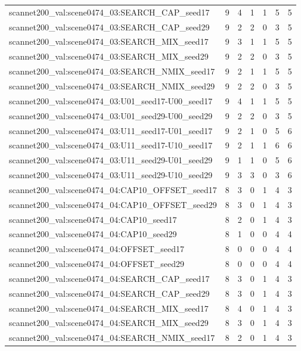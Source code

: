 \begin{table}[t]
\begin{tabular}{lrrrrrr}
scannet200\_val:scene0474\_03:SEARCH\_CAP\_seed17 & 9 & 4 & 1 & 1 & 5 & 5 \\
scannet200\_val:scene0474\_03:SEARCH\_CAP\_seed29 & 9 & 2 & 2 & 0 & 3 & 5 \\
scannet200\_val:scene0474\_03:SEARCH\_MIX\_seed17 & 9 & 3 & 1 & 1 & 5 & 5 \\
scannet200\_val:scene0474\_03:SEARCH\_MIX\_seed29 & 9 & 2 & 2 & 0 & 3 & 5 \\
scannet200\_val:scene0474\_03:SEARCH\_NMIX\_seed17 & 9 & 2 & 1 & 1 & 5 & 5 \\
scannet200\_val:scene0474\_03:SEARCH\_NMIX\_seed29 & 9 & 2 & 2 & 0 & 3 & 5 \\
scannet200\_val:scene0474\_03:U01\_seed17-U00\_seed17 & 9 & 4 & 1 & 1 & 5 & 5 \\
scannet200\_val:scene0474\_03:U01\_seed29-U00\_seed29 & 9 & 2 & 2 & 0 & 3 & 5 \\
scannet200\_val:scene0474\_03:U11\_seed17-U01\_seed17 & 9 & 2 & 1 & 0 & 5 & 6 \\
scannet200\_val:scene0474\_03:U11\_seed17-U10\_seed17 & 9 & 2 & 1 & 1 & 6 & 6 \\
scannet200\_val:scene0474\_03:U11\_seed29-U01\_seed29 & 9 & 1 & 1 & 0 & 5 & 6 \\
scannet200\_val:scene0474\_03:U11\_seed29-U10\_seed29 & 9 & 3 & 3 & 0 & 3 & 6 \\
scannet200\_val:scene0474\_04:CAP10\_OFFSET\_seed17 & 8 & 3 & 0 & 1 & 4 & 3 \\
scannet200\_val:scene0474\_04:CAP10\_OFFSET\_seed29 & 8 & 3 & 0 & 1 & 4 & 3 \\
scannet200\_val:scene0474\_04:CAP10\_seed17 & 8 & 2 & 0 & 1 & 4 & 3 \\
scannet200\_val:scene0474\_04:CAP10\_seed29 & 8 & 1 & 0 & 0 & 4 & 4 \\
scannet200\_val:scene0474\_04:OFFSET\_seed17 & 8 & 0 & 0 & 0 & 4 & 4 \\
scannet200\_val:scene0474\_04:OFFSET\_seed29 & 8 & 0 & 0 & 0 & 4 & 4 \\
scannet200\_val:scene0474\_04:SEARCH\_CAP\_seed17 & 8 & 3 & 0 & 1 & 4 & 3 \\
scannet200\_val:scene0474\_04:SEARCH\_CAP\_seed29 & 8 & 3 & 0 & 1 & 4 & 3 \\
scannet200\_val:scene0474\_04:SEARCH\_MIX\_seed17 & 8 & 4 & 0 & 1 & 4 & 3 \\
scannet200\_val:scene0474\_04:SEARCH\_MIX\_seed29 & 8 & 3 & 0 & 1 & 4 & 3 \\
scannet200\_val:scene0474\_04:SEARCH\_NMIX\_seed17 & 8 & 2 & 0 & 1 & 4 & 3 \\

\end{tabular}
\end{table}
